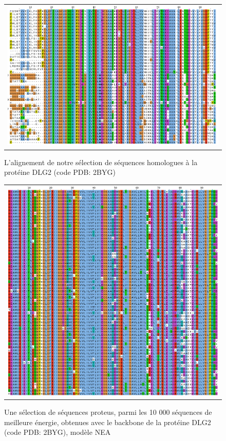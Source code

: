    \begin{figure}[t]
     \centering
     \begin{tabular}{c}
       \includegraphics[width=17cm]{homologues/2BYG.png} \\
     \end{tabular}
     \caption{L'alignement de notre sélection de séquences homologues à la protéine DLG2 (code PDB: 2BYG)}
\label{align_homo:DLG2}
   \end{figure}

   \begin{figure}[t]
     \centering
     \begin{tabular}{c}
       \includegraphics[width=17cm]{proteus/2BYG.png} \\
     \end{tabular}
       \caption{Une sélection de séquences proteus, parmi les 10 000 séquences de meilleure énergie, obtenues avec le backbone de la protéine DLG2 (code PDB: 2BYG), modèle NEA}
\label{align_proteus:DLG2}
   \end{figure}
\clearpage

